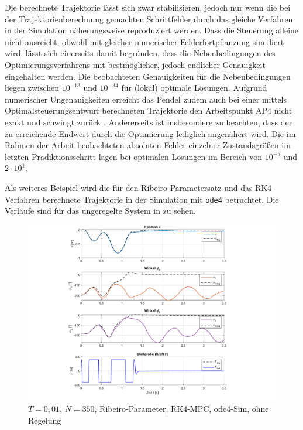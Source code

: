 Die berechnete Trajektorie lässt sich zwar stabilisieren, jedoch nur wenn die bei der Trajektorienberechnung gemachten Schrittfehler durch das gleiche Verfahren in der Simulation näherungsweise reproduziert werden. Dass die Steuerung alleine nicht ausreicht, obwohl mit gleicher numerischer Fehlerfortpflanzung simuliert wird, lässt sich einerseits damit begründen, dass die Nebenbedingungen des Optimierungsverfahrens mit bestmöglicher, jedoch endlicher Genauigkeit eingehalten werden. Die beobachteten Genauigkeiten für die Nebenbedingungen liegen zwischen $10^{-13}$ und $10^{-34}$ für (lokal) optimale Lösungen. Aufgrund numerischer Ungenauigkeiten erreicht das Pendel zudem auch bei einer mittels Optimalsteuerungsentwurf berechneten Trajektorie den Arbeitspunkt AP4 nicht exakt und schwingt zurück \cite{matPrakt2}. Andererseits ist insbesondere zu beachten, dass der zu erreichende Endwert durch die Optimierung lediglich angenähert wird. Die im Rahmen der Arbeit beobachteten absoluten Fehler einzelner Zustandsgrößen im letzten Prädiktionsschritt lagen bei optimalen Lösungen im Bereich von $10^{-5}$ und $2 \cdot 10^{1}$. 

Als weiteres Beispiel wird die für den Ribeiro-Parametersatz und das RK4-Verfahren berechnete Trajektorie in der Simulation mit \texttt{ode4} betrachtet. Die Verläufe sind für das ungeregelte System in  zu sehen. 

\begin{figure}
	\centering
		\includegraphics[scale=\scaleyplots]{Bilder/Trajektorien/F400T0.01_rib_rk4_ode4.pdf}
	\caption{$T=0,01$, $N=350$, Ribeiro-Parameter, RK4-MPC, ode4-Sim, ohne Regelung}
	\label{fig:F400T0.01_rib_rk4_ode4}
\end{figure}

